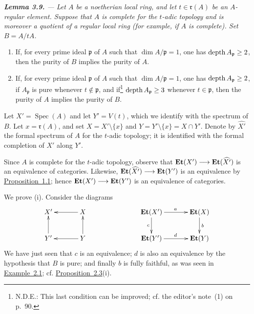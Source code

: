 \medskip
{\itshape
{}\noindent\textbf{Lemma 3.9.} --- Let $A$ be a noetherian local ring, and
let $t\in\mathfrak r(A)$ be an $A$-regular element. Suppose that $A$ is
complete for the $t$-adic topology and is moreover a quotient of a regular
local ring (for example, if $A$ is complete). Set $B=A/tA$.
\begin{enumerate}[label=\textup{(\roman*)},leftmargin=2.2em,itemsep=0.6em,topsep=0.5em]
\item If, for every prime ideal $\mathfrak p$ of $A$ such that
$\dim A/\mathfrak p=1$, one has $\operatorname{depth} A_{\mathfrak p}\geq 2$, then
the purity of $B$ implies the purity of $A$.

\item If, for every prime ideal $\mathfrak p$ of $A$ such that
$\dim A/\mathfrak p=1$, one has $\operatorname{depth} A_{\mathfrak p}\geq 2$, if
$A_{\mathfrak p}$ is pure whenever $t\notin\mathfrak p$, and
if\renewcommand{\thefootnote}{(5)}\footnote{\textsc{N.D.E.}: This last
condition can be improved; cf. the editor's note~(1) on p.~90.}
$\operatorname{depth} A_{\mathfrak p}\geq 3$ whenever $t\in\mathfrak p$, then the
purity of $A$ implies the purity of $B$.
\end{enumerate}
}

\medskip
Let $X'=\operatorname{Spec}(A)$ and let $Y'=V(t)$, which we identify with
the spectrum of $B$. Let $x=\mathfrak r(A)$, and set
$X=X'\setminus\{x\}$ and $Y=Y'\setminus\{x\}=X\cap Y'$. Denote by
$\widehat{X'}$ the formal spectrum of $A$ for the $t$-adic topology; it is
identified with the formal completion of $X'$ along $Y'$.

Since $A$ is complete for the $t$-adic topology, observe that
$\mathbf{Et}(X')\longrightarrow\mathbf{Et}(\widehat{X'})$ is an equivalence of categories.
Likewise, $\mathbf{Et}(\widehat{X'})\longrightarrow\mathbf{Et}(Y')$ is an equivalence by
\hyperref[X.1.1]{Proposition~1.1}; hence $\mathbf{Et}(X')\longrightarrow\mathbf{Et}(Y')$ is an equivalence of
categories.

We prove \textup{(i)}. Consider the diagrams
\[
\xymatrix@C=12mm@R=8mm{
  X' & X\ar[l] &&
  \Et(X')\ar[r]^{a}\ar[d]_{c} & \Et(X)\ar[d]^{b}\\
  Y'\ar[u] & Y\ar[l]\ar[u] &&
  \Et(Y')\ar[r]^{d} & \Et(Y)
}
\]
We have just seen that $c$ is an equivalence; $d$ is also an equivalence by
the hypothesis that $B$ is pure; and finally $b$ is fully faithful, as was
seen in \hyperref[X.2.1]{Example~2.1}; cf. \hyperref[X.2.3]{Proposition~2.3}\textup{(i)}.

